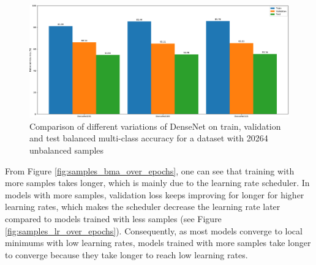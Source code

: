     \begin{figure}[ht]
        \centering
        \includegraphics[width=\textwidth]{figs/densenet_variations_20264_comp.pdf}
        \caption{Comparison of different variations of DenseNet on train, validation and test balanced multi-class accuracy for a dataset with 20264 unbalanced samples}
        \label{fig:densenet_variations_20264_comp}
    \end{figure}
    
    From Figure \ref{fig:samples_bma_over_epochs}, one can see that training with more samples takes longer, which is mainly due to the learning rate scheduler. In models with more samples, validation loss keeps improving for longer for higher learning rates, which makes the scheduler decrease the learning rate later compared to models trained with less samples (see Figure \ref{fig:samples_lr_over_epochs}). Consequently, as most models converge to local minimums with low learning rates, models trained with more samples take longer to converge because they take longer to reach low learning rates. \par
    

